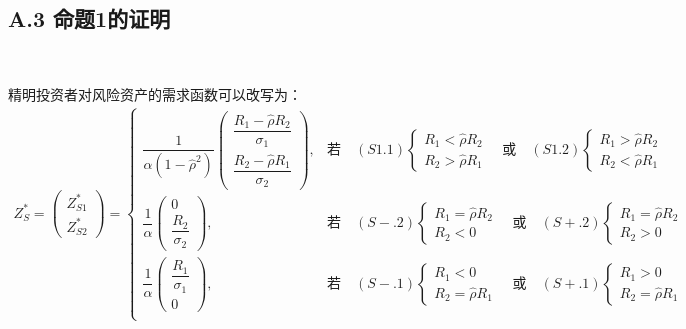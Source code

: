 \documentclass[10.0pt]{article}
\begin{document}

\subsection*{A.3 \quad 命题1的证明}

\quad \


精明投资者对风险资产的需求函数可以改写为：
{\small \begin{eqnarray}
Z_S^* = \left( \begin{matrix} Z_{S 1}^* \\ Z_{S 2}^* \end{matrix} \right) = \left\{ \begin{matrix}
\dfrac1{\alpha (1 - {\hat \rho}^2)} \left( \begin{matrix} \dfrac{R_1 - {\hat \rho} R_2}{\sigma_1} \\ \dfrac{R_2 - {\hat \rho} R_1}{\sigma_2} \end{matrix} \right), & \text{若} \quad (S1.1) \left\{ \begin{matrix} R_1 < {\hat \rho} R_2 \\ R_2 > {\hat \rho} R_1 \end{matrix} \right. \quad \text{或} \quad (S1.2) \left\{ \begin{matrix} R_1 > {\hat \rho} R_2 \\ R_2 < {\hat \rho} R_1 \end{matrix} \right. \\
\dfrac1{\alpha} \left( \begin{matrix} 0 \\ \dfrac{R_2}{\sigma_2} \end{matrix} \right), & \text{若} \quad (S-.2) \left\{ \begin{matrix} R_1 = {\hat \rho} R_2 \\ R_2 < 0 \end{matrix} \right. \quad \text{或} \quad (S+.2) \left\{ \begin{matrix} R_1 = {\hat \rho} R_2 \\ R_2 > 0 \end{matrix} \right. \\
\dfrac1{\alpha} \left( \begin{matrix} \dfrac{R_1}{\sigma_1} \\ 0 \end{matrix} \right), & \text{若} \quad (S-.1) \left\{ \begin{matrix} R_1 < 0 \\ R_2 = {\hat \rho} R_1 \end{matrix} \right. \quad \text{或} \quad (S+.1) \left\{ \begin{matrix} R_1 > 0 \\ R_2 = {\hat \rho} R_1 \end{matrix} \right. \\

\end{matrix}
\end{eqnarray}}
\end{document}
